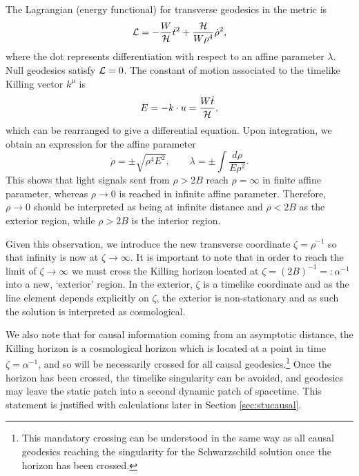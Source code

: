 The Lagrangian (energy functional) for transverse geodesics in the metric  is
\begin{equation*}
    {\cal L} = -\frac{W}{{\cal H}} \dot{t}^2 +\frac{{\cal H}}{W \rho^4} \dot{\rho}^2,
\end{equation*}
where the dot represents differentiation with respect to an affine parameter $\lambda$. Null geodesics satisfy ${\cal L}=0$. The constant of motion associated to the timelike Killing vector $k^\mu$ is
\begin{equation*}
    E = - k \cdot u = \frac{W \dot{t}}{{\cal H}},
\end{equation*}
which can be rearranged to give a differential equation. Upon integration, we obtain an expression for the affine parameter
\begin{equation}
    \dot{\rho} = \pm \sqrt{ \rho^4 E^2}, \qquad \lambda = \pm \int \frac{d\rho}{E \rho^2} .
\end{equation}
This shows that light signals sent from $\rho > 2 B$ reach $\rho = \infty$ in finite affine parameter, whereas $\rho \rightarrow 0$ is reached in infinite affine parameter. Therefore, $\rho \rightarrow 0$ should be interpreted as being at infinite distance and $\rho<2B$ as the exterior region, while $\rho>2B$ is the interior region.

Given this observation, we introduce the new transverse coordinate $\zeta=\rho^{-1}$ so that infinity is now at $\zeta \rightarrow \infty$. It is important to note that in order to reach the limit of $\zeta \rightarrow \infty$ we must cross the Killing horizon located at $\zeta = (2B)^{-1} =: \alpha^{-1}$ into a new, `exterior' region. In the exterior, $\zeta$ is a timelike coordinate and as the line element depends explicitly on $\zeta$, the exterior is non-stationary and as such the solution is interpreted as cosmological.

We also note that for causal information coming from an asymptotic distance, the Killing horizon is a cosmological horizon which is located at a point in time $\zeta = \alpha^{-1}$, and so will be necessarily crossed for all causal geodesics.\footnote{This mandatory crossing can be understood in the same way as all causal geodesics reaching the singularity for the Schwarzschild solution once the horizon has been crossed.} Once the horizon has been crossed, the timelike singularity can be avoided, and geodesics may leave the static patch into a second dynamic patch of spacetime. This statement is justified with calculations later in Section \ref{sec:stucausal}.

